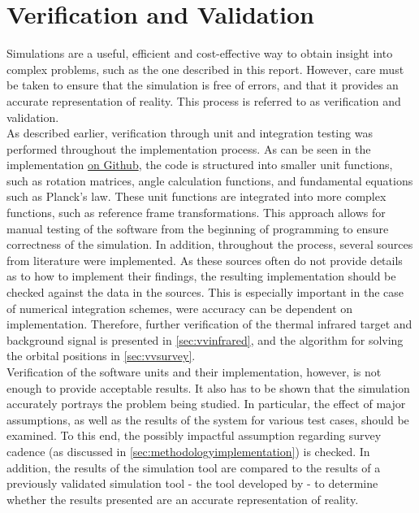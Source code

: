 \chapter{Verification and Validation}
\label{ch:vandv}
Simulations are a useful, efficient and cost-effective way to obtain insight into complex problems, such as the one described in this report. However, care must be taken to ensure that the simulation is free of errors, and that it provides an accurate representation of reality. This process is referred to as verification and validation. \\

As described earlier, verification through unit and integration testing was performed throughout the implementation process. As can be seen in the implementation \href{https://github.com/ArjanVermeulen97/thesis/tree/main/code}{on Github}, the code is structured into smaller unit functions, such as rotation matrices, angle calculation functions, and fundamental equations such as Planck's law. These unit functions are integrated into more complex functions, such as reference frame transformations. This approach allows for manual testing of the software from the beginning of programming to ensure correctness of the simulation. In addition, throughout the process, several sources from literature were implemented. As these sources often do not provide details as to how to implement their findings, the resulting implementation should be checked against the data in the sources. This is especially important in the case of numerical integration schemes, were accuracy can be dependent on implementation. Therefore, further verification of the thermal infrared target and background signal is presented in \autoref{sec:vvinfrared}, and the algorithm for solving the orbital positions in \autoref{sec:vvsurvey}.\\

Verification of the software units and their implementation, however, is not enough to provide acceptable results. It also has to be shown that the simulation accurately portrays the problem being studied. In particular, the effect of major assumptions, as well as the results of the system for various test cases, should be examined. To this end, the possibly impactful assumption regarding survey cadence (as discussed in \autoref{sec:methodologyimplementation}) is checked. In addition, the results of the simulation tool are compared to the results of a previously validated simulation tool - the tool developed by \cite{2017NEOSDT} - to determine whether the results presented are an accurate representation of reality.

